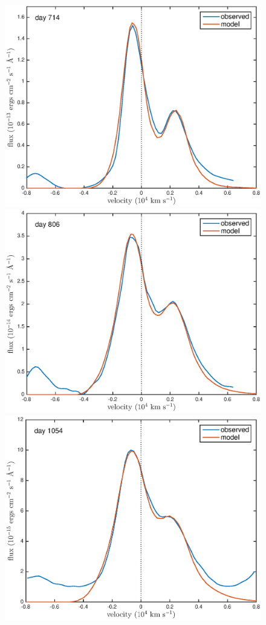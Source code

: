 \documentclass[useAMS,usenatbib,usegraphicx]{mnras}
\begin{document}
\begin{figure}
\begin{center}
\includegraphics[trim =33 10 45 15,clip=true,scale=0.41]{clump_1/best_fit/d714OI_new}
\includegraphics[trim =33 10 45 15,clip=true,scale=0.41]{clump_1/best_fit/d806OI_new}
\includegraphics[trim =33 10 45 15,clip=true,scale=0.41]{clump_1/best_fit/d1054OI}

\end{center}
\end{figure}
\end{document}
